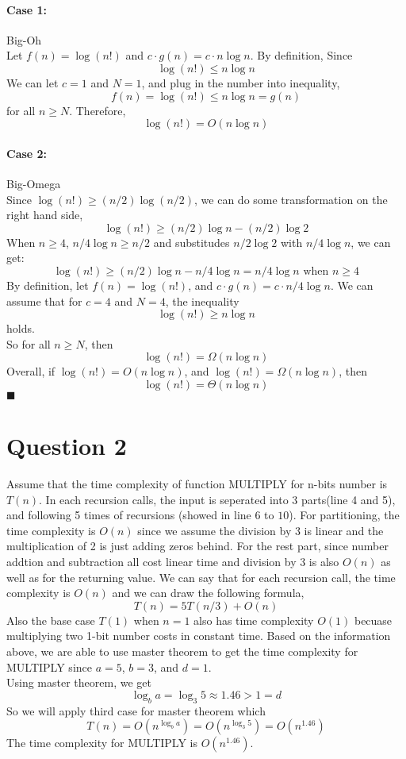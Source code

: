 \documentclass{article}
\begin{document}
    \paragraph{Case 1: } Big-Oh\\
    Let $f(n) = \log(n!)$ and $ c \cdot g(n) = c \cdot n \log n$. By definition, Since
    $$\log(n!) \leq n\log n$$
    We can let $c = 1$ and $N = 1$, and plug in the number into inequality,
    $$f(n) = \log(n!) \leq n\log n = g(n)$$
    for all $n \geq N$. Therefore,
    $$\log(n!) = O(n\log n)$$

    \paragraph{Case 2: } Big-Omega\\
    Since $\log(n!) \geq (n/2)\log(n/2)$, we can do some transformation on the right hand side,
    $$\log(n!) \geq (n/2)\log n - (n/2)\log 2$$
    When $n \geq 4$, $n/4 \log n \geq n/2$ and substitudes $n/2 \log 2$ with
    $n/4 \log n$, we can get:
    $$\log(n!) \geq (n/2)\log n - n/4\log n = n/4\log n \mbox{ when } n \geq 4$$
    By definition, let $f(n) = \log(n!)$, and $c \cdot g(n) = c \cdot n/4 \log n $.
    We can assume that for $c = 4$ and $N = 4$, the inequality 
    $$\log(n!) \geq n\log n$$
    holds.\\
    So for all $n \geq N$, then 
    $$\log(n!) = \Omega(n\log n)$$
    Overall, if $\log(n!) = O(n\log n)$, and $\log(n!) = \Omega(n\log n)$, then
    $$\log(n!) = \Theta(n \log n)$$
    $\blacksquare$








  
\section*{Question 2}
Assume that the time complexity of function MULTIPLY for n-bits number
is $T(n)$. In each recursion calls, the 
input is seperated into 3 parts(line 4 and 5), and following 5 times of recursions
(showed in line $6$ to $10$). For partitioning, the time complexity is $O(n)$ since we assume the division by 3 is linear
and the multiplication of 2 is just adding zeros behind. For the rest part, since number addtion and subtraction
all cost linear time and division by 3 is also $O(n)$ as well as for the returning value. We can say that 
for each recursion call, the time complexity is $O(n)$ and we can draw the following formula,
$$T(n) = 5T(n/3) + O(n)$$
Also the base case $T(1)$ when $n = 1$ also has time complexity $O(1)$ becuase multiplying two 1-bit number costs
in constant time. Based on the information above, we are able to use master
theorem to get the time complexity for MULTIPLY since $a = 5$, $b = 3$, and $d = 1$.\\
Using master theorem, we get
$$\log_b a = \log_3 5 \approx 1.46 > 1 = d$$
So we will apply third case for master theorem which 
$$T(n) = O(n^{\log_b a}) = O(n^{\log_3 5}) = O(n^{1.46})$$
The time complexity for MULTIPLY is $O(n^{1.46})$.
\end{document}
